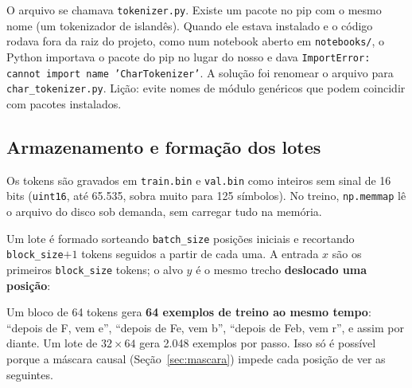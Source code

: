 \documentclass[11pt,a4paper]{article}
\begin{document}
\begin{atencao}
O arquivo se chamava \texttt{tokenizer.py}. Existe um pacote no pip com o mesmo nome (um tokenizador de islandês). Quando ele estava instalado e o código rodava fora da raiz do projeto, como num notebook aberto em \texttt{notebooks/}, o Python importava o pacote do pip no lugar do nosso e dava \texttt{ImportError: cannot import name 'CharTokenizer'}. A solução foi renomear o arquivo para \texttt{char\_tokenizer.py}. Lição: evite nomes de módulo genéricos que podem coincidir com pacotes instalados.
\end{atencao}

\subsection{Armazenamento e formação dos lotes}

Os tokens são gravados em \texttt{train.bin} e \texttt{val.bin} como inteiros sem sinal de 16 bits (\texttt{uint16}, até 65.535, sobra muito para 125 símbolos). No treino, \texttt{np.memmap} lê o arquivo do disco sob demanda, sem carregar tudo na memória.

Um lote é formado sorteando \texttt{batch\_size} posições iniciais e recortando \texttt{block\_size}$+1$ tokens seguidos a partir de cada uma. A entrada $x$ são os primeiros \texttt{block\_size} tokens; o alvo $y$ é o mesmo trecho \textbf{deslocado uma posição}:

\begin{center}
\end{center}

Um bloco de 64 tokens gera \textbf{64 exemplos de treino ao mesmo tempo}: ``depois de F, vem e'', ``depois de Fe, vem b'', ``depois de Feb, vem r'', e assim por diante. Um lote de $32 \times 64$ gera 2.048 exemplos por passo. Isso só é possível porque a máscara causal (Seção~\ref{sec:mascara}) impede cada posição de ver as seguintes.
\end{document}
